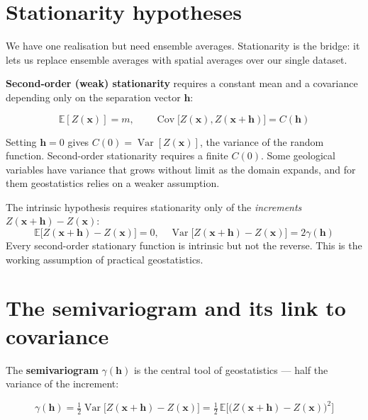 \documentclass[11pt]{article}
\begin{document}
\section{Stationarity hypotheses}

We have one realisation but need ensemble averages. Stationarity is the
bridge: it lets us replace ensemble averages with spatial averages over
our single dataset.

\textbf{Second-order (weak) stationarity} requires a constant mean and a
covariance depending only on the separation vector $\mathbf{h}$:

\begin{eqbox}
\[ \mathbb{E}[Z(\mathbf{x})] = m, \qquad
   \operatorname{Cov}\!\big[Z(\mathbf{x}),Z(\mathbf{x}+\mathbf{h})\big]
   = C(\mathbf{h}) \tag{4.1--4.2}\]
\end{eqbox}

Setting $\mathbf{h}=0$ gives $C(0) = \operatorname{Var}[Z(\mathbf{x})]$,
the variance of the random function. Second-order stationarity requires
a finite $C(0)$. Some geological variables have variance that grows
without limit as the domain expands, and for them geostatistics relies on
a weaker assumption.

\begin{keybox}
The intrinsic hypothesis requires stationarity only of the
\emph{increments} $Z(\mathbf{x}+\mathbf{h})-Z(\mathbf{x})$:
\[ \mathbb{E}\!\big[Z(\mathbf{x}+\mathbf{h})-Z(\mathbf{x})\big]=0,
   \quad
   \operatorname{Var}\!\big[Z(\mathbf{x}+\mathbf{h})-Z(\mathbf{x})\big]
   = 2\gamma(\mathbf{h}) \]
Every second-order stationary function is intrinsic but not the reverse.
This is the working assumption of practical geostatistics.
\end{keybox}

\section{The semivariogram and its link to covariance}

The \textbf{semivariogram} $\gamma(\mathbf{h})$ is the central tool of
geostatistics --- half the variance of the increment:

\begin{eqbox}
\[ \gamma(\mathbf{h}) = \tfrac{1}{2}\operatorname{Var}\!\big[
   Z(\mathbf{x}+\mathbf{h})-Z(\mathbf{x})\big]
   = \tfrac{1}{2}\,\mathbb{E}\!\Big[\big(Z(\mathbf{x}+\mathbf{h})
   -Z(\mathbf{x})\big)^2\Big] \tag{4.3--4.4}\]
\end{eqbox}
\end{document}
